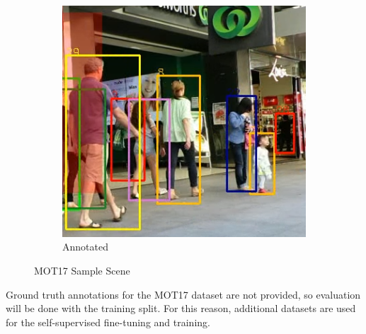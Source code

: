 \documentclass[10pt,twocolumn,letterpaper]{article}
\begin{document}
\begin{figure}[h!]
\begin{subfigure}[b]{0.48\linewidth}
        \includegraphics[width=\linewidth]{docs/reports/figs/MOT17_gt.png}
        \caption{Annotated}
        \label{fig:my_label}
    \end{subfigure}
    \caption{MOT17 Sample Scene}
\end{figure}
Ground truth annotations for the MOT17 dataset are not provided, so evaluation will be done with the training split. For this reason, additional datasets are used for the self-supervised fine-tuning and training.
\end{document}
